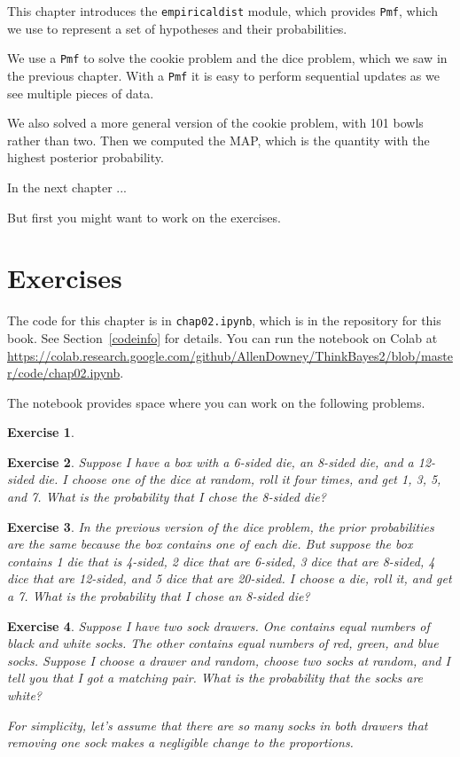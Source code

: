 \documentclass[12pt]{book}
\theoremstyle{exercise}
\newtheorem{exercise}{Exercise}[chapter]
\newcommand{\py}[1]{{\tt #1}}%
\begin{document}
This chapter introduces the \py{empiricaldist} module, which provides \py{Pmf}, which we use to represent a set of hypotheses and their probabilities.

We use a \py{Pmf} to solve the cookie problem and the dice problem, which we saw in the previous chapter.
With a \py{Pmf} it is easy to perform sequential updates as we see multiple pieces of data.

We also solved a more general version of the cookie problem, with 101 bowls rather than two.
Then we computed the MAP, which is the quantity with the highest posterior probability.

In the next chapter ...

But first you might want to work on the exercises.


\section{Exercises}
\label{elvis}

The code for this chapter is in \py{chap02.ipynb}, which is in the repository for this book.  See Section~\ref{codeinfo} for details.
You can run the notebook on Colab at \url{https://colab.research.google.com/github/AllenDowney/ThinkBayes2/blob/master/code/chap02.ipynb}.

The notebook provides space where you can work on the following problems.


\begin{exercise}
\end{exercise}


\begin{exercise}
Suppose I have a box with a 6-sided die, an 8-sided die, and a 12-sided die.
I choose one of the dice at random, roll it four times, and get 1, 3, 5, and 7.
What is the probability that I chose the 8-sided die?
\end{exercise}


\begin{exercise}
In the previous version of the dice problem, the prior probabilities are the same because the box contains one of each die.
But suppose the box contains 1 die that is 4-sided, 2 dice that are 6-sided, 3 dice that are 8-sided, 4 dice that are 12-sided, and 5 dice that are 20-sided.
I choose a die, roll it, and get a 7.  What is the probability that I chose an 8-sided die?
\end{exercise}


\begin{exercise}
Suppose I have two sock drawers.
One contains equal numbers of black and white socks.
The other contains equal numbers of red, green, and blue socks.
Suppose I choose a drawer and random, choose two socks at random, and I tell you that I got a matching pair.
What is the probability that the socks are white?

For simplicity, let's assume that there are so many socks in both drawers that removing one sock makes a negligible change to the proportions.
\end{exercise}
\end{document}
